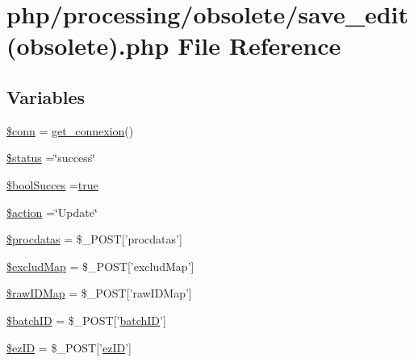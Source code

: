 \hypertarget{processing_2obsolete_2save__edit_07obsolete_08_8php}{\section{php/processing/obsolete/save\-\_\-edit(obsolete).php File Reference}
\label{processing_2obsolete_2save__edit_07obsolete_08_8php}
}
\subsection*{Variables}
\begin{DoxyCompactItemize}
\item 
\hyperlink{processing_2obsolete_2save__edit_07obsolete_08_8php_aa8a5a87b9c1a6a0819b88447cbe41877}{\$conn} = \hyperlink{php__functions_8php_ace18bc10f3fd08f92688ac743e0d8c2e}{get\-\_\-connexion}()
\item 
\hyperlink{processing_2obsolete_2save__edit_07obsolete_08_8php_a58391ea75f2d29d5d708d7050b641c33}{\$status} =\char`\"{}success\char`\"{}
\item 
\hyperlink{processing_2obsolete_2save__edit_07obsolete_08_8php_a538eaf07e91a8c4f140bc04fa2b899cf}{\$bool\-Succes} =\hyperlink{obsolete_2processing__bak_8php_ad85b26c88897c4f65b1a4930711a2e93}{true}
\item 
\hyperlink{processing_2obsolete_2save__edit_07obsolete_08_8php_aa698a3e72116e8e778be0e95d908ee30}{\$action} =\char`\"{}Update\char`\"{}
\item 
\hyperlink{processing_2obsolete_2save__edit_07obsolete_08_8php_a5a756a18d8cc040338f041ca8f8c3666}{\$procdatas} = \$\-\_\-\-P\-O\-S\-T\mbox{[}'procdatas'\mbox{]}
\item 
\hyperlink{processing_2obsolete_2save__edit_07obsolete_08_8php_a296195c83717b71c16843c3c951e29a2}{\$exclud\-Map} = \$\-\_\-\-P\-O\-S\-T\mbox{[}'exclud\-Map'\mbox{]}
\item 
\hyperlink{processing_2obsolete_2save__edit_07obsolete_08_8php_a2c543a123b646cdf11c814983d4a13cf}{\$raw\-I\-D\-Map} = \$\-\_\-\-P\-O\-S\-T\mbox{[}'raw\-I\-D\-Map'\mbox{]}
\item 
\hyperlink{processing_2obsolete_2save__edit_07obsolete_08_8php_aaa6d122ea9cb55b210aadd86e5654a74}{\$batch\-I\-D} = \$\-\_\-\-P\-O\-S\-T\mbox{[}'\hyperlink{obsolete_2processing__bak_8php_a88c5bc4262b7c34f236357f5c53fc99b}{batch\-I\-D}'\mbox{]}
\item 
\hyperlink{processing_2obsolete_2save__edit_07obsolete_08_8php_addb1ec3ba55e413a08cb006ce21974df}{\$ez\-I\-D} = \$\-\_\-\-P\-O\-S\-T\mbox{[}'\hyperlink{admin_rawdata_8php_adf465cadf95987152966d26567509f92}{ez\-I\-D}'\mbox{]}

\end{DoxyCompactItemize}
